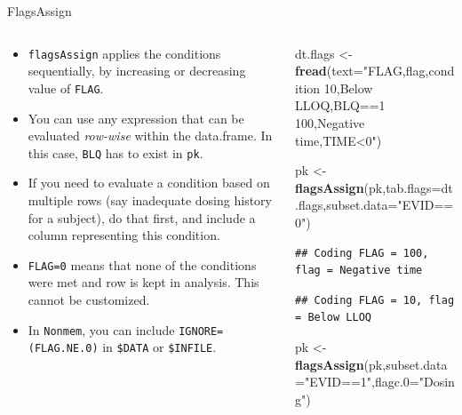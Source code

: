 \documentclass[
  8pt,
  ignorenonframetext,
  aspectratio=169]{beamer}
\newenvironment{Shaded}{\begin{snugshade}}{\end{snugshade}}
\newcommand{\DataTypeTok}[1]{\textcolor[rgb]{0.13,0.29,0.53}{#1}}
\newcommand{\KeywordTok}[1]{\textcolor[rgb]{0.13,0.29,0.53}{\textbf{#1}}}
\newcommand{\NormalTok}[1]{#1}
\newcommand{\StringTok}[1]{\textcolor[rgb]{0.31,0.60,0.02}{#1}}
\providecommand{\tightlist}{%
  \setlength{\itemsep}{0pt}\setlength{\parskip}{0pt}}
\begin{document}
\begin{frame}[fragile]{FlagsAssign}
\protect\hypertarget{flagsassign}{}
\begin{columns}[T]
\begin{column}{0.48\textwidth}
\begin{itemize}
\tightlist
\item
  \texttt{flagsAssign} applies the conditions sequentially, by
  increasing or decreasing value of \texttt{FLAG}.
\item
  You can use any expression that can be evaluated \emph{row-wise}
  within the data.frame. In this case, \texttt{BLQ} has to exist in
  \texttt{pk}.
\item
  If you need to evaluate a condition based on multiple rows (say
  inadequate dosing history for a subject), do that first, and include a
  column representing this condition.
\item
  \texttt{FLAG=0} means that none of the conditions were met and row is
  kept in analysis. This cannot be customized.
\item
  In \texttt{Nonmem}, you can include \texttt{IGNORE=(FLAG.NE.0)} in
  \texttt{\$DATA} or \texttt{\$INFILE}.
\end{itemize}
\end{column}

\begin{column}{0.48\textwidth}
\footnotesize

\begin{Shaded}
\begin{Highlighting}[]
\NormalTok{dt.flags \textless{}{-}}\StringTok{ }\KeywordTok{fread}\NormalTok{(}\DataTypeTok{text=}\StringTok{"FLAG,flag,condition}
\StringTok{10,Below LLOQ,BLQ==1}
\StringTok{100,Negative time,TIME\textless{}0"}\NormalTok{)}

\NormalTok{pk \textless{}{-}}\StringTok{ }\KeywordTok{flagsAssign}\NormalTok{(pk,}\DataTypeTok{tab.flags=}\NormalTok{dt.flags,}\DataTypeTok{subset.data=}\StringTok{"EVID==0"}\NormalTok{)}
\end{Highlighting}
\end{Shaded}

\begin{verbatim}
## Coding FLAG = 100, flag = Negative time
\end{verbatim}

\begin{verbatim}
## Coding FLAG = 10, flag = Below LLOQ
\end{verbatim}

\begin{Shaded}
\begin{Highlighting}[]
\NormalTok{pk \textless{}{-}}\StringTok{ }\KeywordTok{flagsAssign}\NormalTok{(pk,}\DataTypeTok{subset.data=}\StringTok{"EVID==1"}\NormalTok{,}\DataTypeTok{flagc.0=}\StringTok{"Dosing"}\NormalTok{)}
\end{Highlighting}
\end{Shaded}
\end{column}
\end{columns}
\end{frame}
\end{document}
